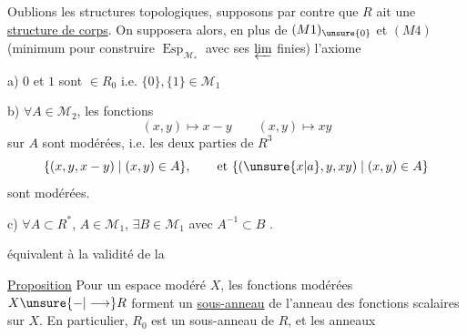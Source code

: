 Oublions les structures topologiques, supposons par contre que $R$ ait une \uline{structure de corps}. On supposera alors,  en plus de $(M1)_{\unsure{0}}$ et $(M4)$ (minimum pour construire $\operatorname{Esp}_{\mathcal M_*}$ avec ses $\varprojlim$ finies) l'axiome


a) $0$ et $1$ sont $\in R_0$ i.e. $\{0\},\{1\}\in\mathcal M_1$

b) $\forall A\in\mathcal M_2$, les fonctions
\[
 (x,y)\longmapsto x-y\qquad
 (x,y)\longmapsto xy
\]
sur $A$ sont modérées,  i.e. les deux parties de $R^3$
\[
 \{(x,y,x-y)\mid(x,y)\in A\},\qquad\text{et }\{(\unsure{x|a},y,xy)\mid(x,y)\in A\}
\]
sont modérées.

c) $\forall A\subset R^*$, $A\in\mathcal M_1$, $\exists B\in\mathcal M_1$ avec $A^{-1}\subset B$ .

   équivalent à la validité de la


\uline{Proposition} Pour un espace modéré $X$, les fonctions modérées $X\unsure{-|\longrightarrow}R$  forment un \uline{sous-anneau} de l'anneau des fonctions scalaires sur $X$. En particulier, $R_0$ est un sous-anneau de $R$, et les anneaux
